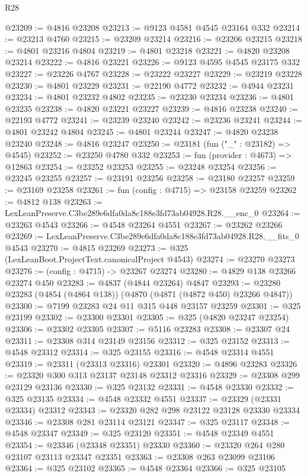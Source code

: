 \begin{lexlean}{R28}
\begin{coremodule}
@23209 := @4816 @23208
@23213 := @9123 @4581 @4545 @23164 @332
@23214 := @23213 @4760
@23215 := @23209 @23214
@23216 := @23206 @23215
@23218 := @4801 @23216 @4804
@23219 := @4801 @23218
@23221 := @4820 @23208 @23214
@23222 := @4816 @23221
@23226 := @9123 @4595 @4545 @23175 @332
@23227 := @23226 @4767
@23228 := @23222 @23227
@23229 := @23219 @23228
@23230 := @4801 @23229
@23231 := @22190 @4772
@23232 := @4944 @23231
@23234 := @4801 @23232 @4802
@23235 := @23230 @23234
@23236 := @4801 @23235
@23238 := @4820 @23221 @23227
@23239 := @4816 @23238
@23240 := @22193 @4772
@23241 := @23239 @23240
@23242 := @23236 @23241
@23244 := @4801 @23242 @4804
@23245 := @4801 @23244
@23247 := @4820 @23238 @23240
@23248 := @4816 @23247
@23250 := @23181 (fun ("_" : @23182) => @4545)
@23252 := @23250 @4780 @332
@23253 := fun (provider : @4673) => @12863
@23254 := @23252 @23253
@23255 := @23248 @23254
@23256 := @23245 @23255
@23257 := @23191 @23256
@23258 := @23180 @23257
@23259 := @23169 @23258
@23261 := fun (config : @4715) => @23158 @23259
@23262 := @4812 @138
@23263 := LexLeanPreserve.C3be289e6dfa0da8c188e3fd73ab04928.R28.__enc_0
@23264 := @23263 @4543
@23266 := @4548 @23264 @4551
@23267 := @23262 @23266
@23269 := LexLeanPreserve.C3be289e6dfa0da8c188e3fd73ab04928.R28.__fits_0 @4543
@23270 := @4815 @23269
@23273 := @325 (LexLeanBoot.ProjectText.canonicalProject @4543)
@23274 := @23270 @23273
@23276 := (config : @4715) -> @23267 @23274
@23280 := @4829 @138 @23266 @23274 @450
@23283 := @4837 (@4844 @23264) @4847
@23293 := @23280 @23283 (@4854 (@4864 @138)) (@4870 (@4871 (@4872 @450) @23266 @4847))
@23300 := @7199 @23283 @24 @11 @315 @448 @23157 @23259
@23301 := @325 @23199
@23302 := @23300 @23301
@23305 := @325 (@4820 @23247 @23254)
@23306 := @23302 @23305
@23307 := @5116 @23283
@23308 := @23307 @24
@23311 := @23308 @314 @23149 @23156
@23312 := @325 @23152
@23313 := @4548 @23312
@23314 := @325 @23155
@23316 := @4548 @23314 @4551
@23319 := @23311 (@23313 @23316) @23301
@23320 := @4896 @23283
@23326 := @23320 @300 @313 @23137 @23148 @23312 @23316
@23329 := @23308 @299 @23129 @23136
@23330 := @325 @23132
@23331 := @4548 @23330
@23332 := @325 @23135
@23334 := @4548 @23332 @4551
@23337 := @23329 (@23331 @23334) @23312
@23343 := @23320 @282 @298 @23122 @23128 @23330 @23334
@23346 := @23308 @281 @23114 @23121
@23347 := @325 @23117
@23348 := @4548 @23347
@23349 := @325 @23120
@23351 := @4548 @23349 @4551
@23354 := @23346 (@23348 @23351) @23330
@23360 := @23320 @264 @280 @23107 @23113 @23347 @23351
@23363 := @23308 @263 @23099 @23106
@23364 := @325 @23102
@23365 := @4548 @23364
@23366 := @325 @23105

\end{coremodule}
\end{lexlean}
